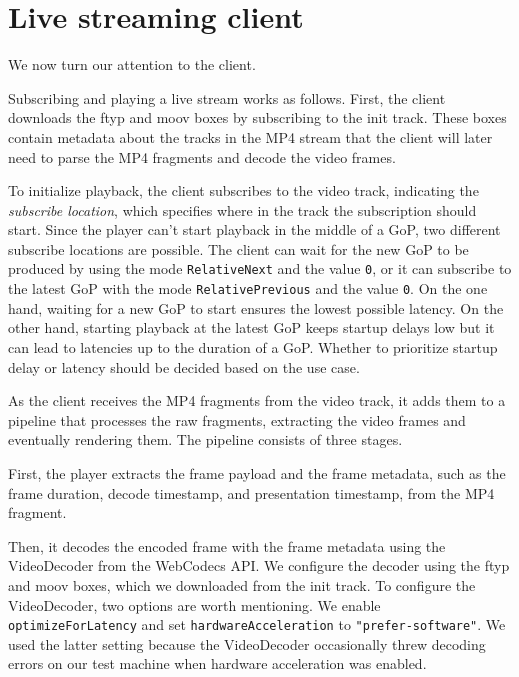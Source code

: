 \section{Live streaming client}\label{section:baseline_client}
We now turn our attention to the client.

Subscribing and playing a live stream works as follows. First, the client downloads the ftyp and moov boxes by subscribing to the init track. These boxes contain metadata about the tracks in the MP4 stream %
that the client will later need to parse the MP4 fragments and decode the video frames.

To initialize playback, the client subscribes to the video track, indicating the \textit{subscribe location}, which specifies where in the track the subscription should start.  Since the player can't start playback in the middle of a \ac{GoP}, two different subscribe locations are possible. The client can wait for the new \ac{GoP} to be produced by using the mode \lstinline{RelativeNext} and the value \lstinline{0}, or it can subscribe to the latest \ac{GoP} with the mode \lstinline{RelativePrevious} and the value \lstinline{0}. On the one hand, waiting for a new GoP to start ensures the lowest possible latency. On the other hand, starting playback at the latest GoP keeps startup delays low but it can lead to latencies up to the duration of a GoP. %
Whether to prioritize startup delay or latency should be decided based on the use case.

As the client receives the MP4 fragments from the video track, it adds them to a pipeline that processes the raw fragments, extracting the video frames and eventually rendering them. The pipeline consists of three stages. 

First, the player extracts the frame payload and the frame metadata, such as the frame duration, decode timestamp, and presentation timestamp, from the MP4 fragment. 

Then, it decodes the encoded frame with the frame metadata using the VideoDecoder from the WebCodecs API. We configure the decoder using the ftyp and moov boxes, which we downloaded from the init track. To configure the VideoDecoder, two options are worth mentioning. We enable \lstinline{optimizeForLatency} %
and set \lstinline{hardwareAcceleration} to \lstinline{"prefer-software"}. We used the latter setting because the VideoDecoder occasionally threw decoding errors on our test machine when hardware acceleration was enabled. %

